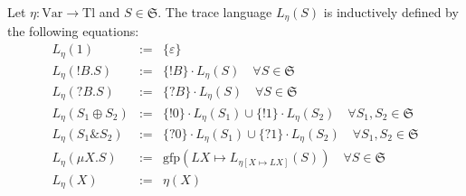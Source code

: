 \documentclass{llncs}
\newcommand*{\Var}{\mathrm{Var}}
\newcommand*{\Tl}{\mathrm{Tl}}
\renewcommand*{\S}{\mathfrak{S}}
\newcommand*{\gfp}{\mathrm{gfp}}
\newcommand*{\union}{\cup}
\newcommand*{\send}{\mathord{!}}
\newcommand*{\recv}{\mathord{?}}
\newcommand*{\echoice}{\oplus}
\newcommand*{\ichoice}{\mathop{\&}}
\newcommand*{\concat}{\cdot}
\renewcommand*{\|}{\;|\;}
\renewcommand*{\epsilon}{\varepsilon}
\begin{document}
\begin{definition}
  \label{def:trace_language}
  Let $\eta\colon \Var \to \Tl$ and $S \in \S$.
  The trace language $L_\eta(S)$ is inductively defined by the following
  equations:
  \begin{eqnarray}
    \label{def:trace_language:1}
    L_\eta(1) &:=& \{ \epsilon \} \\
    \label{def:trace_language:send}
    L_\eta(\send B.S) &:=& \{ \send B \} \concat L_\eta(S) \quad \forall S \in \S \\
    \label{def:trace_language:recv}
    L_\eta(\recv B.S) &:=& \{ \recv B \} \concat L_\eta(S) \quad \forall S \in \S \\
    \label{def:trace_language:echoice}
    L_\eta(S_1 \echoice S_2)
      &:=&   \{ \send 0 \} \concat L_\eta(S_1)
      \union \{ \send 1 \} \concat L_\eta(S_2)
      \quad \forall S_1, S_2 \in \S \\
    \label{def:trace_language:ichoice}
    L_\eta(S_1 \ichoice S_2)
      &:=&   \{ \recv 0 \} \concat L_\eta(S_1)
      \union \{ \recv 1 \} \concat L_\eta(S_2)
      \quad \forall S_1, S_2 \in \S \\
    \label{def:trace_language:mu}
    L_\eta(\mu X.S) &:=& \gfp(LX \mapsto L_{\eta[X \mapsto LX]}(S))
      \quad \forall S \in \S \\
    \label{def:trace_language:var}
    L_\eta(X) &:=& \eta(X)
  \end{eqnarray}
\end{definition}
\end{document}
